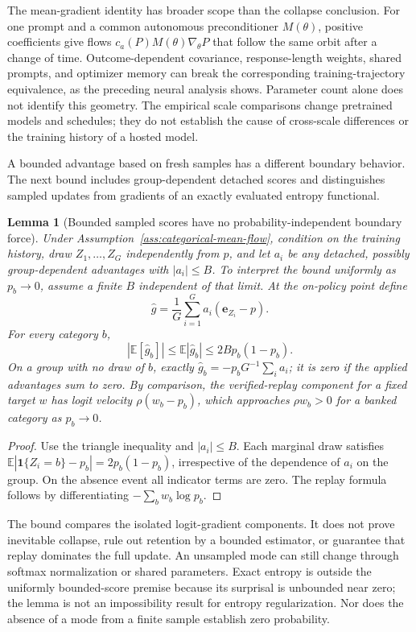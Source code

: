 \documentclass{article}
\newcommand{\1}{\mathbf 1}
\newcommand{\E}{\mathbb E}
\newtheorem{lemma}{Lemma}[section]
\theoremstyle{remark}
\theoremstyle{definition}
\theoremstyle{plain}
\begin{document}
The mean-gradient identity has broader scope than the collapse conclusion.
For one prompt and a common autonomous preconditioner $M(\theta)$, positive
coefficients give flows $c_a(P)M(\theta)\nabla_\theta P$ that follow the same
orbit after a change of time. Outcome-dependent covariance, response-length
weights, shared prompts, and optimizer memory can break the corresponding
training-trajectory equivalence, as the preceding neural analysis shows.
Parameter count alone does not identify this geometry. The empirical scale
comparisons change pretrained models and schedules; they do not establish
the cause of cross-scale differences or the training history of a hosted
model.

A bounded advantage based on fresh samples has a different boundary behavior.
The next bound includes group-dependent detached scores and distinguishes
sampled updates from gradients of an exactly evaluated entropy functional.

\begin{lemma}[Bounded sampled scores have no probability-independent boundary force]
\label{lem:sampled-score-bound}
Under Assumption~\ref{ass:categorical-mean-flow}, condition on the training history, draw
$Z_1,\ldots,Z_G$ independently from $p$, and let $a_i$ be any detached,
possibly group-dependent advantages with $|a_i|\le B$. To interpret the
bound uniformly as $p_b\to0$, assume a finite $B$ independent of that limit.
At the on-policy point define
\[
 \widehat g=\frac1G\sum_{i=1}^G a_i(\mathbf e_{Z_i}-p).
\]
For every category $b$,
\[
 |\E[\widehat g_b]|\le\E|\widehat g_b|
 \le 2B p_b(1-p_b).
\]
On a group with no draw of $b$, exactly
$\widehat g_b=-p_bG^{-1}\sum_i a_i$; it is zero if the applied advantages
sum to zero. By comparison, the verified-replay component for a fixed target
$w$ has logit velocity $\rho(w_b-p_b)$, which approaches $\rho w_b>0$
for a banked category as $p_b\to0$.
\end{lemma}

\begin{proof}
Use the triangle inequality and $|a_i|\le B$. Each marginal draw satisfies
$\E|\1\{Z_i=b\}-p_b|=2p_b(1-p_b)$, irrespective of the dependence of
$a_i$ on the group. On the absence event all indicator terms are zero.
The replay formula follows by differentiating $-\sum_b w_b\log p_b$.
\end{proof}

The bound compares the isolated logit-gradient components. It does not prove
inevitable collapse, rule out retention by a bounded estimator, or guarantee
that replay dominates the full update. An unsampled mode can still change
through softmax normalization or shared parameters. Exact entropy is outside
the uniformly bounded-score premise because its surprisal is unbounded near
zero; the lemma is not an impossibility result for entropy regularization.
Nor does the absence of a mode from a finite sample establish zero probability.
\end{document}
